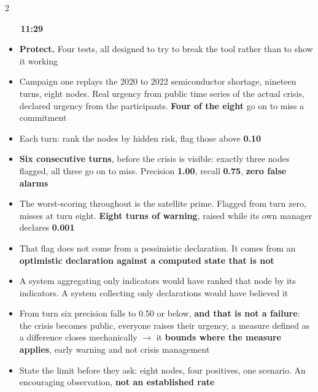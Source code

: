 \documentclass[a4paper,8pt]{extarticle}
\newcommand{\slidehead}[3]{%
  \par\vspace{2.8pt}\noindent
  \colorbox{altenNavy}{\textcolor{white}{\bfseries\,\footnotesize #1\,}}%
  \hspace{4pt}{\bfseries\color{altenNavy}#2}%
  \hfill{\bfseries\scriptsize\color{altenAzure}#3}\par\vspace{0.5pt}}
\newcommand{\scene}[1]{{\bfseries\color{altenAzureDark}#1}}
\newcommand{\num}[1]{\textbf{#1}}
\begin{document}
\begin{multicols}{2}
\slidehead{14}{Result one, early warning}{11:29}
\begin{itemize}
  \item \scene{Protect.} Four tests, all designed to try to break the tool rather than to show it working
  \item Campaign one replays the 2020 to 2022 semiconductor shortage, nineteen turns, eight nodes. Real urgency from public time series of the actual crisis, declared urgency from the participants. \num{Four of the eight} go on to miss a commitment
  \item Each turn: rank the nodes by hidden risk, flag those above \num{0.10}
  \item \num{Six consecutive turns}, before the crisis is visible: exactly three nodes flagged, all three go on to miss. Precision \num{1.00}, recall \num{0.75}, \num{zero false alarms}
  \item The worst-scoring throughout is the satellite prime. Flagged from turn zero, misses at turn eight. \num{Eight turns of warning}, raised while its own manager declares \num{0.001}
  \item That flag does not come from a pessimistic declaration. It comes from an \textbf{optimistic declaration against a computed state that is not}
  \item A system aggregating only indicators would have ranked that node by its indicators. A system collecting only declarations would have believed it
  \item From turn six precision falls to 0.50 or below, \textbf{and that is not a failure}: the crisis becomes public, everyone raises their urgency, a measure defined as a difference closes mechanically $\rightarrow$ it \textbf{bounds where the measure applies}, early warning and not crisis management
  \item State the limit before they ask: eight nodes, four positives, one scenario. An encouraging observation, \textbf{not an established rate}
\end{itemize}


\end{multicols}
\end{document}
